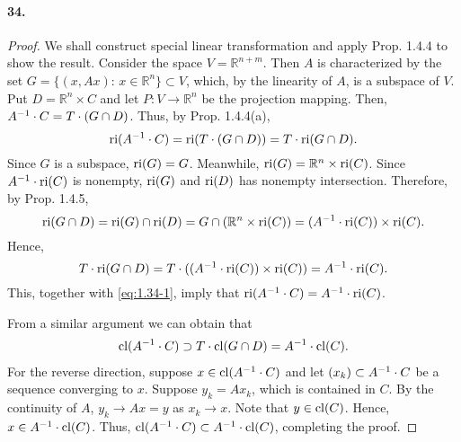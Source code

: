   \paragraph{34.}
  \begin{proof}
    We shall construct special linear transformation and apply Prop. 1.4.4 to
    show the result. Consider the space $V=\mathbb{R}^{n+m}$. Then $A$ is
    characterized by the set $G=\{(x,Ax):\,x\in\mathbb{R}^n\}\subset V$, which,
    by the linearity of $A$, is a subspace of $V$. Put $D=\mathbb{R}^n\times C$ 
    and let $P:V\to\mathbb{R}^n$ be the projection mapping. Then, $A^{-1}\cdot 
    C=T\cdot(G\cap D)$. Thus, by Prop. 1.4.4(a),
    \begin{equation}
      \label{eq:1.34-1}
      \operatorname{ri}(A^{-1}\cdot C)=\operatorname{ri}(T\cdot(G\cap D))=T\cdot\operatorname{ri}(G\cap D).
    \end{equation}
    Since $G$ is a subspace, $\operatorname{ri}(G)=G$. Meanwhile, $\operatorname{ri}(G)=\mathbb{R}^n\times
    \operatorname{ri}(C)$. Since $A^{-1}\cdot\operatorname{ri}(C)$ is nonempty, $\operatorname{ri}(G)$ and $\operatorname{ri}(D)$ has
    nonempty intersection. Therefore, by Prop. 1.4.5,
    \[
      \operatorname{ri}(G\cap D)=\operatorname{ri}(G)\cap\operatorname{ri}(D)=G\cap(\mathbb{R}^n\times\operatorname{ri}(C))=
      (A^{-1}\cdot\operatorname{ri}(C))\times\operatorname{ri}(C).
    \]
    Hence,
    \[
      T\cdot\operatorname{ri}(G\cap D)=T\cdot((A^{-1}\cdot\operatorname{ri}(C))\times\operatorname{ri}(C))=
      A^{-1}\cdot\operatorname{ri}(C).
    \]
    This, together with \eqref{eq:1.34-1}, imply that $\operatorname{ri}(A^{-1}\cdot C)=A^{-1}
    \cdot\operatorname{ri}(C)$.\par
    From a similar argument we can obtain that 
    \begin{align*}
      \operatorname{cl}(A^{-1}\cdot C)\supset T\cdot\operatorname{cl}(G\cap D)=A^{-1}\cdot\operatorname{cl}(C).
    \end{align*}
    For the reverse direction, suppose $x\in\operatorname{cl}(A^{-1}\cdot C)$ and let $(x_k)
    \subset A^{-1}\cdot C$ be a sequence converging to $x$. Suppose $y_k=Ax_k$,
    which is contained in $C$. By the continuity of $A$, $y_k\to Ax=y$ as $x_k
    \to x$. Note that $y\in\operatorname{cl}(C)$. Hence, $x\in A^{-1}\cdot\operatorname{cl}(C)$. Thus, $\operatorname{cl}
    (A^{-1}\cdot C)\subset A^{-1}\cdot\operatorname{cl}(C)$, completing the proof.
  \end{proof}
  
